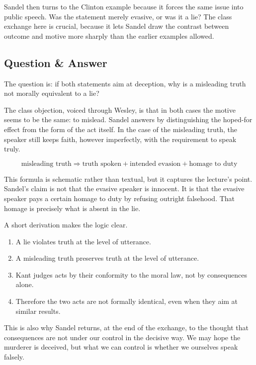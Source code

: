 Sandel then turns to the Clinton example because it forces the same issue into public speech. Was the statement merely evasive, or was it a lie? The class exchange here is crucial, because it lets Sandel draw the contrast between outcome and motive more sharply than the earlier examples allowed.

\subsection{Question \& Answer}

The question is: if both statements aim at deception, why is a misleading truth not morally equivalent to a lie?

The class objection, voiced through Wesley, is that in both cases the motive seems to be the same: to mislead. Sandel answers by distinguishing the hoped-for effect from the form of the act itself. In the case of the misleading truth, the speaker still keeps faith, however imperfectly, with the requirement to speak truly.

\begin{equation}
\text{misleading truth}
\Longrightarrow
\text{truth spoken} + \text{intended evasion} + \text{homage to duty}
\end{equation}

This formula is schematic rather than textual, but it captures the lecture's point. Sandel's claim is not that the evasive speaker is innocent. It is that the evasive speaker pays a certain homage to duty by refusing outright falsehood. That homage is precisely what is absent in the lie.

A short derivation makes the logic clear.

\begin{enumerate}
\item A lie violates truth at the level of utterance.
\item A misleading truth preserves truth at the level of utterance.
\item Kant judges acts by their conformity to the moral law, not by consequences alone.
\item Therefore the two acts are not formally identical, even when they aim at similar results.
\end{enumerate}

This is also why Sandel returns, at the end of the exchange, to the thought that consequences are not under our control in the decisive way. We may hope the murderer is deceived, but what we can control is whether we ourselves speak falsely.

